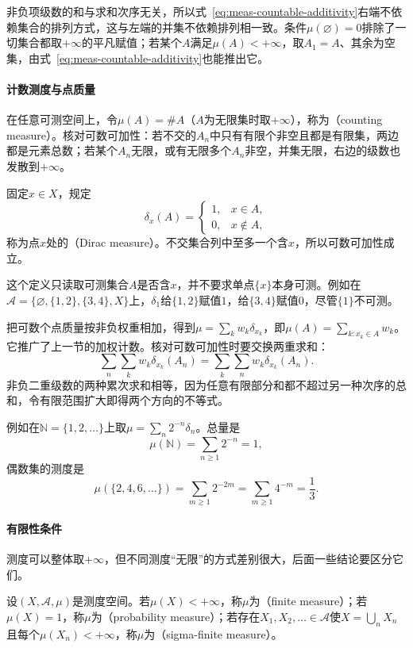 非负项级数的和与求和次序无关，所以式~\eqref{eq:meas-countable-additivity}右端不依赖集合的排列方式，这与左端的并集不依赖排列相一致。条件$\mu(\varnothing)=0$排除了一切集合都取$+\infty$的平凡赋值；若某个$A$满足$\mu(A)<+\infty$，取$A_1=A$、其余为空集，由式~\eqref{eq:meas-countable-additivity}也能推出它。

\paragraph{计数测度与点质量}
在任意可测空间上，令$\mu(A)=\#A$（$A$为无限集时取$+\infty$），称为（counting measure）。核对可数可加性：若不交的$A_n$中只有有限个非空且都是有限集，两边都是元素总数；若某个$A_n$无限，或有无限多个$A_n$非空，并集无限，右边的级数也发散到$+\infty$。

固定$x\in X$，规定
\[
 \delta_x(A)=\begin{cases}1,&x\in A,\\0,&x\notin A,\end{cases}
\]
称为点$x$处的（Dirac measure）。不交集合列中至多一个含$x$，所以可数可加性成立。

这个定义只读取可测集合$A$是否含$x$，并不要求单点$\{x\}$本身可测。例如在$\mathcal A=\{\varnothing,\{1,2\},\{3,4\},X\}$上，$\delta_1$给$\{1,2\}$赋值$1$，给$\{3,4\}$赋值$0$，尽管$\{1\}$不可测。

把可数个点质量按非负权重相加，得到$\mu=\sum_kw_k\delta_{x_k}$，即$\mu(A)=\sum_{k:x_k\in A}w_k$。它推广了上一节的加权计数。核对可数可加性时要交换两重求和：
\[
 \sum_n\sum_kw_k\delta_{x_k}(A_n)=\sum_k\sum_nw_k\delta_{x_k}(A_n).
\]
非负二重级数的两种累次求和相等，因为任意有限部分和都不超过另一种次序的总和，令有限范围扩大即得两个方向的不等式。

例如在$\mathbb N=\{1,2,\dots\}$上取$\mu=\sum_n2^{-n}\delta_n$。总量是
\[
 \mu(\mathbb N)=\sum_{n\geq1}2^{-n}=1,
\]
偶数集的测度是
\[
 \mu(\{2,4,6,\dots\})=\sum_{m\geq1}2^{-2m}=\sum_{m\geq1}4^{-m}=\frac13.
\]

\paragraph{有限性条件}
测度可以整体取$+\infty$，但不同测度“无限”的方式差别很大，后面一些结论要区分它们。

\begin{definition}
\label{def:meas-finiteness}
设$(X,\mathcal A,\mu)$是测度空间。若$\mu(X)<+\infty$，称$\mu$为（finite measure）；若$\mu(X)=1$，称$\mu$为（probability measure）；若存在$X_1,X_2,\dots\in\mathcal A$使$X=\bigcup_nX_n$且每个$\mu(X_n)<+\infty$，称$\mu$为（sigma-finite measure）。
\end{definition}


